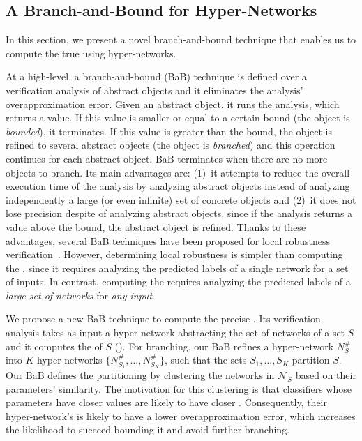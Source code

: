 \subsection{A Branch-and-Bound for Hyper-Networks}\label{sec:overview_bab}
In this section, we present a novel branch-and-bound technique that enables us to compute the true \propa using hyper-networks. 


At a high-level, a branch-and-bound (BaB) technique is defined over a verification analysis of abstract objects and it eliminates the analysis' overapproximation error. Given an abstract object, it runs the analysis, which returns a value. If this value is smaller or equal to a certain bound (the object is \emph{bounded}), it terminates. If this value is greater than the bound, the object is refined to several abstract objects (the object is \emph{branched}) and this operation continues for each abstract object. BaB terminates when there are no more objects to branch. Its main advantages are: (1)~it attempts to reduce the overall execution time of the analysis by analyzing abstract objects instead of analyzing independently a large (or even infinite) set of concrete objects and (2)~it does not lose precision despite of analyzing abstract objects, since if the analysis returns a value above the bound, the abstract object is refined.
Thanks to these advantages, several BaB techniques have been proposed for local robustness verification~\cite{ref76,ref77,ref78,ref79,ref80,ref81}. %
However, determining local robustness is simpler than computing the \propa, since it requires analyzing the predicted labels of a single network for a set of inputs. In contrast, computing the \propa requires analyzing the predicted labels of a \emph{large set of networks} for \emph{any input}. %

We propose a new BaB technique to compute the precise \propa. Its verification analysis takes as input a hyper-network abstracting the set of networks of a set $S$ and it computes the \propa of $S$ ().
%
For branching, our BaB refines a hyper-network $N^\#_S$ into $K$ hyper-networks $\{N_{S_1}^\#,\ldots,N_{S_K}^\#\}$, such that the sets $S_1, \ldots,S_K$ partition $S$.
Our BaB defines the partitioning by clustering the networks in $\mathcal{N}_S$ based on their parameters' similarity. 
The motivation for this clustering is that classifiers whose parameters have closer values are likely to have closer \propa. Consequently, their hyper-network's \propa is likely to have a lower overapproximation error, which increases the likelihood to succeed bounding it and avoid further branching.  


